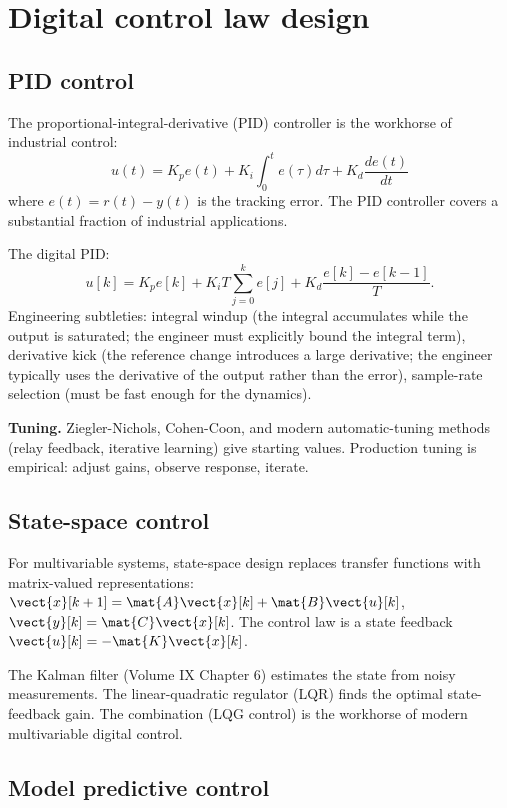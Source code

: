 \section{Digital control law design}

\subsection{PID control}

The proportional-integral-derivative (PID) controller is the workhorse of industrial control:
\[
u(t) = K_p e(t) + K_i \int_0^t e(\tau) d\tau + K_d \frac{de(t)}{dt}
\]
where $e(t) = r(t) - y(t)$ is the tracking error. The PID controller covers a substantial fraction of industrial applications.

The digital PID:
\[
u[k] = K_p e[k] + K_i T \sum_{j=0}^{k} e[j] + K_d \frac{e[k] - e[k-1]}{T}.
\]
Engineering subtleties: integral windup (the integral accumulates while the output is saturated; the engineer must explicitly bound the integral term), derivative kick (the reference change introduces a large derivative; the engineer typically uses the derivative of the output rather than the error), sample-rate selection (must be fast enough for the dynamics).

\textbf{Tuning.} Ziegler-Nichols, Cohen-Coon, and modern automatic-tuning methods (relay feedback, iterative learning) give starting values. Production tuning is empirical: adjust gains, observe response, iterate.

\subsection{State-space control}

For multivariable systems, state-space design replaces transfer functions with matrix-valued representations: $\vect{x}[k+1] = \mat{A} \vect{x}[k] + \mat{B} \vect{u}[k]$, $\vect{y}[k] = \mat{C} \vect{x}[k]$. The control law is a state feedback $\vect{u}[k] = -\mat{K} \vect{x}[k]$.

The Kalman filter (Volume IX Chapter 6) estimates the state from noisy measurements. The linear-quadratic regulator (LQR) finds the optimal state-feedback gain. The combination (LQG control) is the workhorse of modern multivariable digital control.

\subsection{Model predictive control}

